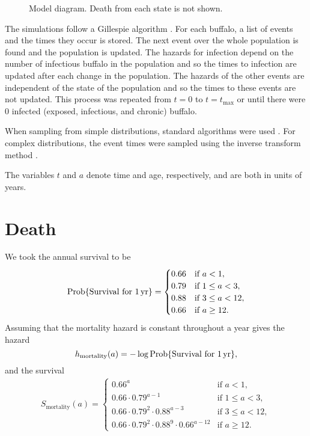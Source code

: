 \documentclass[12pt]{article}
\DeclareMathOperator{\Prob}{Prob}
\begin{document}
\begin{figure}
  \centering
  
  \caption{Model diagram.  Death from each state is not shown.}
  \label{fig:diagram}
\end{figure}


The simulations follow a Gillespie algorithm \citep{gillespie_1977}.
For each buffalo, a list of events and the times they occur is stored.
The next event over the whole population is found and the population
is updated.  The hazards for infection depend on the number of
infectious buffalo in the population and so the times to infection are
updated after each change in the population.  The hazards of the other
events are independent of the state of the population and so the times
to these events are not updated.  This process was repeated from $t =
0$ to $t = t_{\text{max}}$ or until there were $0$ infected (exposed,
infectious, and chronic) buffalo.

When sampling from simple distributions, standard algorithms were used
\citep{scipy}.  For complex distributions, the event times were
sampled using the inverse transform method \citep{rubinstein_1981}.

The variables $t$ and $a$ denote time and age, respectively, and are
both in units of years.

\section{Death}

We took the annual survival to be
\begin{equation}
  \Prob\{\text{Survival for $\unit[1]{yr}$}\}
  =
  \begin{cases}
    0.66 & \text{if $a < 1$},
    \\
    0.79 & \text{if $1 \leq a < 3$},
    \\
    0.88 & \text{if $3 \leq a < 12$},
    \\
    0.66 & \text{if $a \geq 12$}.
  \end{cases}
\end{equation}
Assuming that the mortality hazard is constant throughout a year gives
the hazard
\begin{equation}
  h_{\text{mortality}}(a)
  = - \log \Prob\{\text{Survival for $\unit[1]{yr}$}\},
\end{equation}
and the survival
\begin{equation}
  \begin{split}
    S_{\text{mortality}}(a)
    =
    \begin{cases}
      0.66^a
      & \text{if $a < 1$},
      \\
      0.66 \cdot 0.79^{a - 1}
      & \text{if $1 \leq a < 3$},
      \\
      0.66 \cdot 0.79^2 \cdot 0.88^{a - 3}
      & \text{if $3 \leq a < 12$},
      \\
      0.66 \cdot 0.79^2 \cdot 0.88^9 \cdot 0.66^{a - 12}
      & \text{if $a \geq 12$}.
    \end{cases}
  \end{split}
\end{equation}
\end{document}
